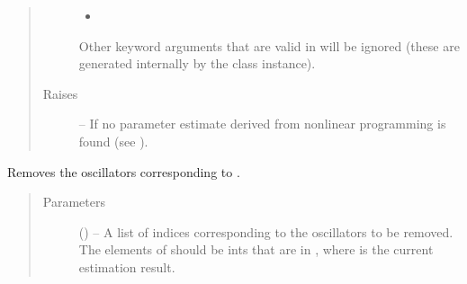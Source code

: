 \documentclass[letterpaper,10pt,english]{sphinxmanual}
\begin{document}
\begin{fulllineitems}
\begin{fulllineitems}
\begin{quote}
\begin{description}
\begin{itemize}
\item {} 
\sphinxAtStartPar
{}

\end{itemize}

\sphinxAtStartPar
Other keyword arguments that are valid in
{\hyperref[\detokenize{references/plot:nmrespy.plot.plot_result}]{}} will be ignored (these are
generated internally by the class instance).


\item[{Raises}] \leavevmode
\sphinxAtStartPar
{\hyperref[\detokenize{references/errors:nmrespy._errors.AttributeIsNoneError}]{}} – If no parameter estimate derived from nonlinear programming
    is found (see {\hyperref[\detokenize{references/core:nmrespy.core.Estimator.nonlinear_programming}]{}}).

\end{description}\end{quote}


\nopagebreak


\sphinxAtStartPar
{\hyperref[\detokenize{references/plot:nmrespy.plot.plot_result}]{}}



\end{fulllineitems}


\begin{fulllineitems}
\label{\detokenize{references/core:nmrespy.core.Estimator.remove_oscillators}}
\sphinxAtStartPar
Removes the oscillators corresponding to .
\begin{quote}\begin{description}
\item[{Parameters}] \leavevmode
\sphinxAtStartPar
{} () – A list of indices corresponding to the oscillators to be
removed. The elements of  should be ints that
are in , where  is the
current estimation result.


\end{description}
\end{quote}
\end{fulllineitems}
\end{fulllineitems}
\end{document}
